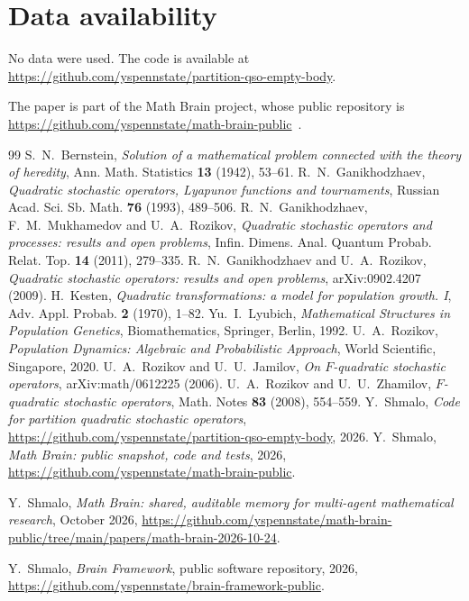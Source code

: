 \documentclass[11pt]{amsart}
\theoremstyle{definition}
\theoremstyle{remark}
\numberwithin{equation}{section}
\begin{document}
\section*{Data availability}
No data were used. The code is available at\\ \url{https://github.com/yspennstate/partition-qso-empty-body}.

The paper is part of the Math Brain project, whose public repository is \url{https://github.com/yspennstate/math-brain-public}~\cite{MathBrainRepo}.

\begin{thebibliography}{99}
 S.~N.~Bernstein, \emph{Solution of a mathematical problem connected with the theory of heredity}, Ann. Math. Statistics \textbf{13} (1942), 53--61.
 R.~N.~Ganikhodzhaev, \emph{Quadratic stochastic operators, Lyapunov functions and tournaments}, Russian Acad. Sci. Sb. Math. \textbf{76} (1993), 489--506.
 R.~N.~Ganikhodzhaev, F.~M.~Mukhamedov and U.~A.~Rozikov, \emph{Quadratic stochastic operators and processes: results and open problems}, Infin. Dimens. Anal. Quantum Probab. Relat. Top. \textbf{14} (2011), 279--335.
 R.~N.~Ganikhodzhaev and U.~A.~Rozikov, \emph{Quadratic stochastic operators: results and open problems}, arXiv:0902.4207 (2009).
 H.~Kesten, \emph{Quadratic transformations: a model for population growth. I}, Adv. Appl. Probab. \textbf{2} (1970), 1--82.
 Yu.~I.~Lyubich, \emph{Mathematical Structures in Population Genetics}, Biomathematics, Springer, Berlin, 1992.
 U.~A.~Rozikov, \emph{Population Dynamics: Algebraic and Probabilistic Approach}, World Scientific, Singapore, 2020.
 U.~A.~Rozikov and U.~U.~Jamilov, \emph{On $F$-quadratic stochastic operators}, arXiv:math/0612225 (2006).
 U.~A.~Rozikov and U.~U.~Zhamilov, \emph{$F$-quadratic stochastic operators}, Math. Notes \textbf{83} (2008), 554--559.
 Y.~Shmalo, \emph{Code for partition quadratic stochastic operators}, \url{https://github.com/yspennstate/partition-qso-empty-body}, 2026.
 Y.~Shmalo, \emph{Math Brain: public snapshot, code and tests}, 2026, \url{https://github.com/yspennstate/math-brain-public}.

 Y.~Shmalo, \emph{Math Brain: shared, auditable memory for multi-agent mathematical research}, October 2026, \url{https://github.com/yspennstate/math-brain-public/tree/main/papers/math-brain-2026-10-24}.

 Y.~Shmalo, \emph{Brain Framework}, public software repository, 2026, \url{https://github.com/yspennstate/brain-framework-public}.

\end{thebibliography}
\end{document}

